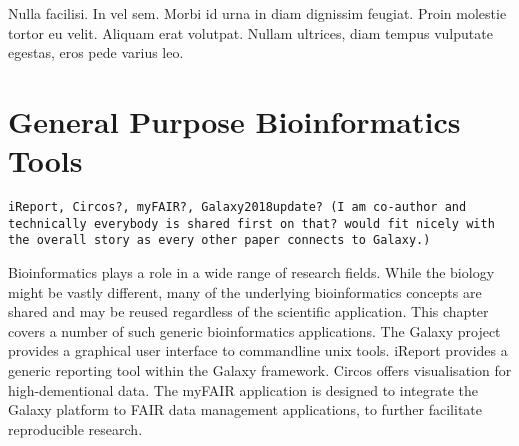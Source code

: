 \begin{savequote}[75mm]
Nulla facilisi. In vel sem. Morbi id urna in diam dignissim feugiat. Proin molestie tortor eu velit. Aliquam erat volutpat. Nullam ultrices, diam tempus vulputate egestas, eros pede varius leo.
\end{savequote}

\chapter{General Purpose Bioinformatics Tools}
\label{chapter:general}
\setcounter{figure}{-1}
\setcounter{table}{-1}
\setcounter{section}{-1}
\setcounter{NAT@ctr}{-1}

\verb+iReport, Circos?, myFAIR?, Galaxy2018update? (I am co-author and technically everybody is shared first on that? would fit nicely with the overall story as every other paper connects to Galaxy.)+

Bioinformatics plays a role in a wide range of research fields. While the biology might be vastly different, many of the underlying bioinformatics concepts are shared and may be reused regardless of the scientific application. This chapter covers a number of such generic bioinformatics applications. The Galaxy project provides a graphical user interface to commandline unix tools. iReport provides a generic reporting tool within the Galaxy framework. Circos offers visualisation for high-dementional data. The myFAIR application is designed to integrate the Galaxy platform to FAIR data management applications, to further facilitate reproducible research.
